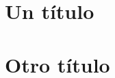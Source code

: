 \documentclass{report}
\begin{document}
\tableofcontents
\chapter[]{Un título}
\chapter{Otro título}
\end{document}
